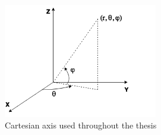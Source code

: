 \begin{figure}[!ht]
    \centering
    \includegraphics[width=0.6\textwidth]{Figures/3dCoord.png}
    \caption{Cartesian axis used throughout the thesis}
    \label{fig:3daxis}
\end{figure}

